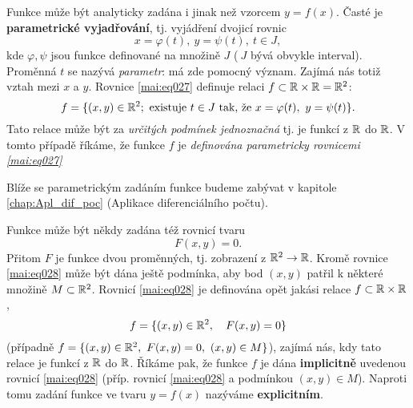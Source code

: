       Funkce může být analyticky zadána i jinak než vzorcem $y=f(x)$. Časté je \textbf{parametrické 
      vyjadřování}, tj. vyjádření dvojicí rovnic 
      \begin{equation}\label{mai:eq027}
        x=\varphi(t),\ y=\psi(t),\ t\in J,
      \end{equation}
      kde $\varphi, \psi$ jsou funkce definované na množině $J$ ($\ J$ bývá obvykle interval). 
      Proměnná $t$ se nazývá \emph{parametr}: má zde pomocný význam. Zajímá nás totiž vztah mezi 
      $x$ a $y$. Rovnice \ref{mai:eq027} definuje relaci 
      $f\subset\mathbb{R}\times\mathbb{R}=\mathbb{R}^2$:
      \begin{equation*}
        f = \{(x,y)\in\mathbb{R}^2; \text{ existuje } t\in J \text{ tak, že } x=\varphi(t),\ y=\psi(t)\}.
      \end{equation*}      
      Tato relace může být za \emph{určitých podmínek jednoznačná} tj. je funkcí z $\mathbb{R}$ do 
      $\mathbb{R}$. V tomto případě říkáme, že funkce $f$ je \emph{definována parametricky rovnicemi 
      \ref{mai:eq027}}
      
        
      
      Blíže se parametrickým zadáním funkce budeme zabývat v kapitole \ref{chap:Apl_dif_poc}
      (Aplikace diferenciálního počtu).
      
      Funkce může být někdy zadána též rovnicí tvaru 
      \begin{equation}\label{mai:eq028}
        F(x,y) = 0.
      \end{equation}
      Přitom $F$ je funkce dvou proměnných, tj. zobrazení z $\mathbb{R}^2\rightarrow\mathbb{R}$. Kromě 
      rovnice \ref{mai:eq028} může být dána ještě podmínka, aby bod $(x,y)$ patřil k některé 
      množině $M\subset\mathbb{R}^2$. Rovnicí \ref{mai:eq028} je definována opět jakási relace 
      $f\subset\mathbb{R}\times\mathbb{R}$,
      \begin{equation}
        f = \{(x,y)\in\mathbb{R}^2,\quad F(x,y)=0 \}
      \end{equation}
      (případně $f = \{(x,y)\in\mathbb{R}^2,\ F(x,y)=0,\ (x,y)\in M \}$), zajímá nás, kdy tato relace 
      je funkcí z $\mathbb{R}$ do $\mathbb{R}$. Říkáme pak, že funkce $f$ je dána \textbf{implicitně} 
      uvedenou rovnicí \ref{mai:eq028} (příp. rovnicí \ref{mai:eq028} a podmínkou $(x,y)\in 
      M$). Naproti tomu zadání funkce ve tvaru $y=f(x)$ nazýváme \textbf{explicitním}.

